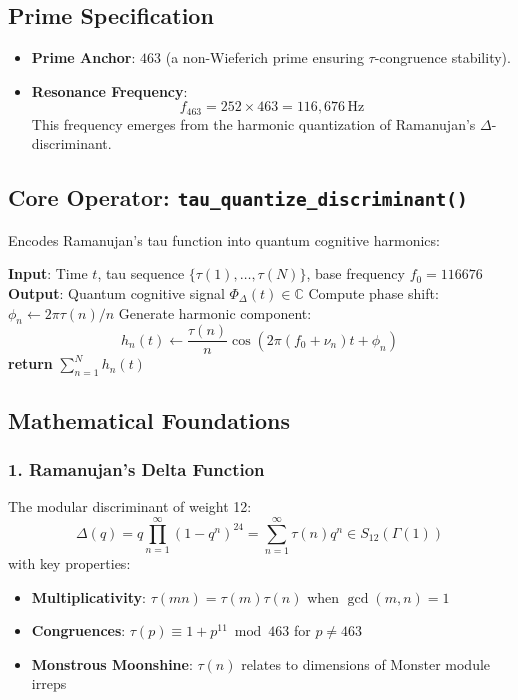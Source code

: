 \documentclass[12pt]{article}
\begin{document}
\subsection*{Prime Specification}
\begin{itemize}
    \item \textbf{Prime Anchor}: $463$ (a non-Wieferich prime ensuring $\tau$-congruence stability).
    \item \textbf{Resonance Frequency}:
    \[
    f_{463} = 252 \times 463 = \boxed{116,\!676} \, \text{Hz}
    \]
    This frequency emerges from the harmonic quantization of Ramanujan's $\Delta$-discriminant.
\end{itemize}

\subsection*{Core Operator: \texttt{tau\_quantize\_discriminant()}}
Encodes Ramanujan's tau function into quantum cognitive harmonics:

\begin{algorithm}[H]
\caption{Modular Tau Quantization}
\begin{algorithmic}[1]
\State \textbf{Input}: Time $t$, tau sequence $\{\tau(1),\dots,\tau(N)\}$, base frequency $f_0=116676$
\State \textbf{Output}: Quantum cognitive signal $\Phi_\Delta(t) \in \mathbb{C}$
    \State Compute phase shift: $\phi_n \gets 2\pi \tau(n)/n$
    \State Generate harmonic component:
    \[
    h_n(t) \gets \frac{\tau(n)}{n} \cos\left(2\pi(f_0 + \nu_n)t + \phi_n\right)
    \]
\EndFor
\State \textbf{return} $\sum_{n=1}^N h_n(t)$ 
\end{algorithmic}
\end{algorithm}

\subsection*{Mathematical Foundations}
\subsubsection*{1. Ramanujan's Delta Function}
The modular discriminant of weight 12:
\[
\Delta(q) = q\prod_{n=1}^\infty (1-q^n)^{24} = \sum_{n=1}^\infty \tau(n)q^n \in S_{12}(\Gamma(1))
\]
with key properties:
\begin{itemize}
    \item \textbf{Multiplicativity}: $\tau(mn) = \tau(m)\tau(n)$ when $\gcd(m,n)=1$
    \item \textbf{Congruences}: $\tau(p) \equiv 1 + p^{11} \bmod 463$ for $p \neq 463$
    \item \textbf{Monstrous Moonshine}: $\tau(n)$ relates to dimensions of Monster module irreps
\end{itemize}
\end{document}
